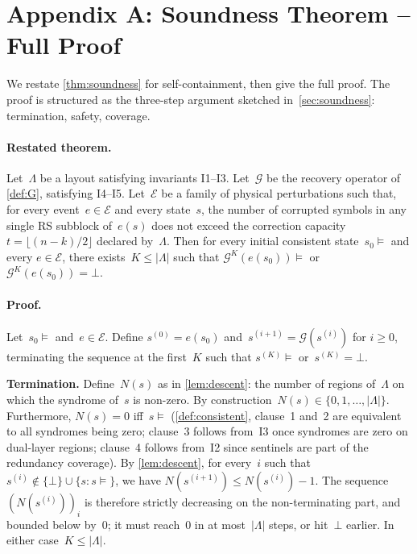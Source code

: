 \section{Appendix A: Soundness Theorem -- Full Proof}\label{app:proof}

We restate \cref{thm:soundness} for self-containment, then give the
full proof. The proof is structured as the three-step argument
sketched in~\cref{sec:soundness}: termination, safety, coverage.

\paragraph{Restated theorem.}
Let~\(\Lambda\) be a layout satisfying invariants I1--I3.
Let~\(\mathcal{G}\) be the recovery operator of \cref{def:G},
satisfying I4--I5. Let~\(\mathcal{E}\) be a family of physical
perturbations such that, for every event~\(e \in \mathcal{E}\) and
every state~\(s\), the number of corrupted symbols in any single
RS subblock of~\(e(s)\) does not exceed the correction capacity
\(t = \lfloor (n-k)/2 \rfloor\) declared by~\(\Lambda\). Then for
every initial consistent state~\(s_0 \models\) and every
\(e \in \mathcal{E}\), there exists~\(K \le |\Lambda|\) such that
\(\mathcal{G}^{K}(e(s_0)) \models\) or
\(\mathcal{G}^{K}(e(s_0)) = \bot\).

\paragraph{Proof.}
Let~\(s_0 \models\) and~\(e \in \mathcal{E}\). Define
\(s^{(0)} = e(s_0)\) and~\(s^{(i+1)} = \mathcal{G}(s^{(i)})\) for
\(i \ge 0\), terminating the sequence at the first~\(K\) such that
\(s^{(K)} \models\) or~\(s^{(K)} = \bot\).

\textbf{Termination.}
Define~\(N(s)\) as in \cref{lem:descent}: the number of regions
of~\(\Lambda\) on which the syndrome of~\(s\) is non-zero.
By construction~\(N(s) \in \{0, 1, \dots, |\Lambda|\}\).
Furthermore, \(N(s) = 0\) iff~\(s \models\) (\cref{def:consistent},
clause~1 and~2 are equivalent to all syndromes being zero; clause~3
follows from~I3 once syndromes are zero on dual-layer regions;
clause~4 follows from~I2 since sentinels are part of the redundancy
coverage). By \cref{lem:descent}, for every~\(i\) such that
\(s^{(i)} \notin \{\bot\} \cup \{s : s \models\}\), we have
\(N(s^{(i+1)}) \le N(s^{(i)}) - 1\). The sequence~\((N(s^{(i)}))_i\)
is therefore strictly decreasing on the non-terminating part, and
bounded below by~0; it must reach~0 in at most~\(|\Lambda|\) steps,
or hit~\(\bot\) earlier. In either case~\(K \le |\Lambda|\).

